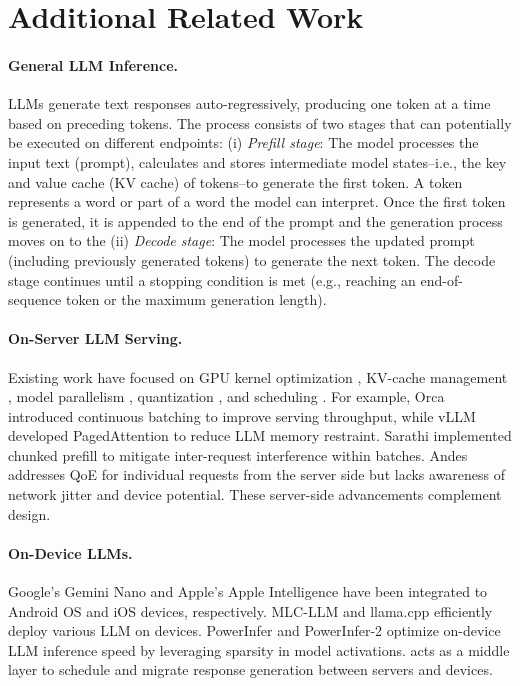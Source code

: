 \section{Additional Related Work}\label{appendix:related_work}

\paragraph{General LLM Inference.}
\label{sec:general_llm_inference}
LLMs generate text responses auto-regressively, producing one token at a time based on preceding tokens. The process consists of two stages that can potentially be executed on different endpoints: (i) \emph{Prefill stage}: The model processes the input text (prompt), calculates and stores intermediate model states--i.e., the key and value cache (KV cache) of tokens--to generate the first token. A token represents a word or part of a word the model can interpret. Once the first token is generated, it is appended to the end of the prompt and the generation process moves on to the (ii) \emph{Decode stage}: The model processes the updated prompt (including previously generated tokens) to generate the next token. The decode stage continues until a stopping condition is met (e.g., reaching an end-of-sequence token or the maximum generation length).

\paragraph{On-Server LLM Serving.}
Existing work have focused on GPU kernel optimization \citep{flashattention,flashinfer}, KV-cache management \citep{lin2024infinite,scissorhands,mooncake}, model parallelism \citep{shoeybi2019megatron,pope2023efficiently,liu2023ring}, quantization \citep{smoothquant,awq,dettmers2022gpt3}, and scheduling \citep{orca,vllm,sarathi,wang2025hygen}.
For example, Orca \cite{orca} introduced continuous batching to improve serving throughput, while vLLM \cite{vllm} developed PagedAttention to reduce LLM memory restraint. Sarathi \citep{sarathi} implemented chunked prefill to mitigate inter-request interference within batches. 
Andes \citep{andes} addresses QoE for individual requests from the server side but lacks awareness of network jitter and device potential. These server-side advancements complement \disco{} design.

\paragraph{On-Device LLMs.}
Google's Gemini Nano \cite{gemini_nano} and Apple's Apple Intelligence \cite{appleintelligence} have been integrated to Android OS and iOS devices, respectively.
MLC-LLM \cite{mlc-llm} and llama.cpp \citep{llama_cpp} efficiently deploy various LLM on devices. PowerInfer \cite{powerinfer} and PowerInfer-2 \cite{powerinfer2} optimize on-device LLM inference speed by leveraging sparsity in model activations. \disco{} acts as a middle layer to schedule and migrate response generation between servers and devices.
